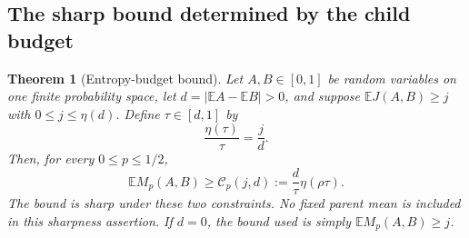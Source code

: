 \documentclass[11pt]{article}
\newtheorem{theorem}{Theorem}[section]
\theoremstyle{remark}\newtheorem{remark}[theorem]{Remark}
\newcommand{\E}{\mathbb E}\newcommand{\PP}{\mathbb P}\newcommand{\dd}{\,\mathrm d}
\numberwithin{equation}{section}
\begin{document}
\subsection{The sharp bound determined by the child budget}
\begin{theorem}[Entropy-budget bound]\label{thm:I15-budget}
Let $A,B\in[0,1]$ be random variables on one finite probability space,
let $d=|\E A-\E B|>0$, and suppose
$\E J(A,B)\ge j$ with $0\le j\le\eta(d)$. Define $\tau\in[d,1]$ by
\begin{equation}\label{eq:I15-budget-root}
 \frac{\eta(\tau)}\tau=\frac jd.
\end{equation}
Then, for every $0\le p\le1/2$,
\begin{equation}\label{eq:I15-budget-bound}
 \boxed{\E M_p(A,B)\ge\mathcal C_p(j,d):=
                    \frac d\tau\eta(\rho\tau).}
\end{equation}
The bound is sharp under these two constraints. No fixed parent mean is
included in this sharpness assertion. If $d=0$, the bound used is simply
$\E M_p(A,B)\ge j$.
\end{theorem}
\end{document}
